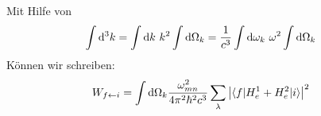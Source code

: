 	Mit Hilfe von
		\begin{align*}
			\int \mathrm{d}^3 k &= \int \mathrm{d} k ~k^2 \int \mathrm{d} \Omega_k
			= \frac{1}{c^3} \int \mathrm{d} \omega_k ~\omega^2 \int \mathrm{d} \Omega_k
		\end{align*}
	Können wir schreiben:
		\begin{align*}
			W_{f \leftarrow i} &= \int \mathrm{d} \Omega_k 
			\frac{\omega_{mn}^2}{4 \pi^2 \hbar^2 c^3}
			\sum_\lambda 
			\left|\braket{f | H_e^1 + H_e^2 | i}\right|^2
		\end{align*}